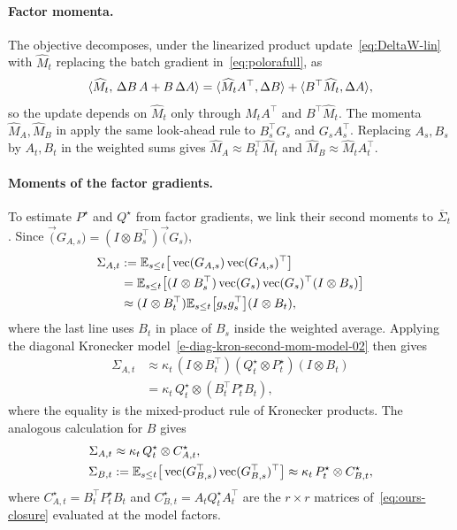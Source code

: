 \paragraph{Factor momenta.} The objective decomposes, under the linearized
product update~\eqref{eq:DeltaW-lin} with $\widehat M_t$ replacing the batch
gradient in~\eqref{eq:polorafull}, as
\[
  \langle \widehat M_t,\,\Delta B\,A+B\,\Delta A \rangle
  =\langle \widehat M_tA^\top,\Delta B \rangle+\langle B^\top\widehat M_t,\Delta A \rangle,
\]
so the update depends on $\widehat M_t$ only through $\widehat M_tA^\top$
and $B^\top\widehat M_t$. The momenta $\widehat M_A,\widehat M_B$ in
 apply the same look-ahead rule to $B_s^\top G_s$ and
$G_sA_s^\top$. Replacing $A_s,B_s$ by $A_t,B_t$ in the weighted sums gives
$\widehat M_A\approx B_t^\top\widehat M_t$ and
$\widehat M_B\approx\widehat M_tA_t^\top$.

\paragraph{Moments of the factor gradients.} To estimate $P^\star$ and
$Q^\star$ from factor gradients, we link their second moments to $\overline{\Sigma}_t$.
Since
$\vec(G_{A,s})=(I\otimes B_s^\top)\vec(G_s)$,
\begin{align*}
 \Sigma_{A,t} &:=  \mathbb{E}_{s \leq t}\big[ \operatorname{vec}(G_{A,s})  \operatorname{vec}(G_{A,s})^\top\big]  \\
 &=  \mathbb{E}_{s \leq t}\big[ (I\otimes B_s^\top)\operatorname{vec}(G_s)\operatorname{vec}(G_s)^\top   (I\otimes B_s)\big]  \\
   &\approx  (I\otimes B_t^\top) \mathbb{E}_{s \leq t}\big[ g_s g_s^\top   \big]  (I\otimes B_t),
\end{align*}
where the last line uses $B_t$ in place of $B_s$ inside the weighted
average. Applying the diagonal Kronecker model~\eqref{e-diag-kron-second-mom-model-02}
then gives
\begin{align*}
 \Sigma_{A,t}
   &\approx
   \kappa_t\,
   (I\otimes B_t^\top)
   (Q^\star_t\otimes P^\star_t)
   (I\otimes B_t) \\
   &= \kappa_t\,Q^\star_t\otimes(B_t^\top P^\star_tB_t),
\end{align*}
where the equality is the mixed-product rule of Kronecker products. The
analogous calculation for $B$ gives
\begin{align}
  \Sigma_{A,t}
    &\approx \kappa_t\,Q^\star_t\otimes C^\star_{A,t},
  \nonumber \\
  \Sigma_{B,t}
    &:=
      \mathbb{E}_{s \leq t}\big[
        \operatorname{vec}(G_{B,s}^\top)\operatorname{vec}(G_{B,s}^\top)^\top
      \big]
    \approx \kappa_t\,P^\star_t\otimes C^\star_{B,t},
  \label{eq:observable-moments-02}
\end{align}
where $C^\star_{A,t}=B_t^\top P^\star_tB_t$ and
$C^\star_{B,t}=A_tQ^\star_tA_t^\top$ are the $r\times r$ matrices
of~\eqref{eq:ours-closure} evaluated at the model factors.

